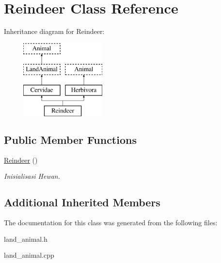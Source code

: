\hypertarget{class_reindeer}{}\section{Reindeer Class Reference}
\label{class_reindeer}
Inheritance diagram for Reindeer\+:\begin{figure}[H]
\begin{center}
\leavevmode
\includegraphics[height=4.000000cm]{class_reindeer}
\end{center}
\end{figure}
\subsection*{Public Member Functions}
\begin{DoxyCompactItemize}
\item 
\hyperlink{class_reindeer_abf6ea0887ccaa39ac9b1d927f4833aaa}{Reindeer} ()\hypertarget{class_reindeer_abf6ea0887ccaa39ac9b1d927f4833aaa}{}\label{class_reindeer_abf6ea0887ccaa39ac9b1d927f4833aaa}

\begin{DoxyCompactList}\small\item\em Inisialisasi Hewan. \end{DoxyCompactList}\end{DoxyCompactItemize}
\subsection*{Additional Inherited Members}


The documentation for this class was generated from the following files\+:\begin{DoxyCompactItemize}
\item 
land\+\_\+animal.\+h\item 
land\+\_\+animal.\+cpp\end{DoxyCompactItemize}
